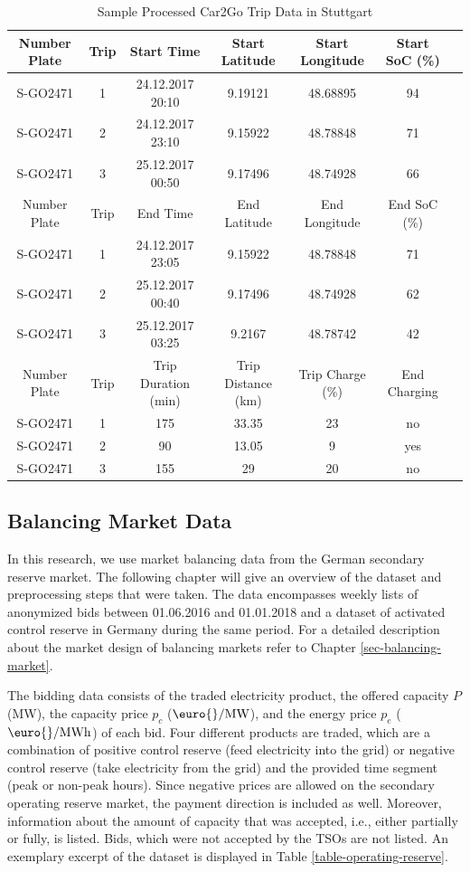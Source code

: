 \documentclass[a4paper, 12pt]{article}
\begin{document}
\begin{table}
    \caption{Sample Processed Car2Go Trip Data in Stuttgart \label{table-car2go-processed}}
    \centering
    \begin{tabular}{cc|ccccc}
      \hline
      \hline
      Number Plate & Trip & Start Time & Start Latitude & Start Longitude & Start SoC (\%)\\
      \hline
      S-GO2471 & 1 & 24.12.2017 20:10 & 9.19121 & 48.68895 & 94\\
      S-GO2471 & 2 & 24.12.2017 23:10 & 9.15922 & 48.78848 & 71\\
      S-GO2471 & 3 & 25.12.2017 00:50 & 9.17496 & 48.74928 & 66\\
      \hline
      Number Plate & Trip & End Time & End Latitude & End Longitude & End SoC (\%)\\
      \hline
      S-GO2471 & 1 & 24.12.2017 23:05 & 9.15922 & 48.78848 & 71\\
      S-GO2471 & 2 & 25.12.2017 00:40 & 9.17496 & 48.74928 & 62\\
      S-GO2471 & 3 & 25.12.2017 03:25 & 9.2167 & 48.78742 & 42\\
      \hline
      Number Plate & Trip & Trip Duration (min) & Trip Distance (km) & Trip Charge (\%) & End Charging\\
      \hline
      S-GO2471 & 1 & 175 & 33.35 & 23 & no\\
      S-GO2471 & 2 & 90 & 13.05 & 9 & yes\\
      S-GO2471 & 3 & 155 & 29 & 20 & no\\
      \hline
      \hline
    \end{tabular}
\end{table}

\subsection{Balancing Market Data}
\label{sec:orgaf3924e}
In this research, we use market balancing data from the German secondary reserve
market. The following chapter will give an overview of the dataset and
preprocessing steps that were taken. The data encompasses weekly lists of
anonymized bids between 01.06.2016 and 01.01.2018 and a dataset of activated
control reserve in Germany during the same period. For a detailed description
about the market design of balancing markets refer to Chapter
\ref{sec-balancing-market}.

The bidding data consists of the traded electricity product, the offered
capacity \(P\) (MW), the capacity price \(p_c\) (\(\text{\euro{}/MW}\)), and the
energy price \(p_e\) (\(\text{\euro{}/MWh}\)) of each bid. Four different products
are traded, which are a combination of positive control reserve (feed
electricity into the grid) or negative control reserve (take electricity from
the grid) and the provided time segment (peak or non-peak hours). Since negative
prices are allowed on the secondary operating reserve market, the payment
direction is included as well. Moreover, information about the amount of
capacity that was accepted, i.e., either partially or fully, is listed. Bids,
which were not accepted by the TSOs are not listed. An exemplary excerpt of the
dataset is displayed in Table \ref{table-operating-reserve}.
\end{document}

